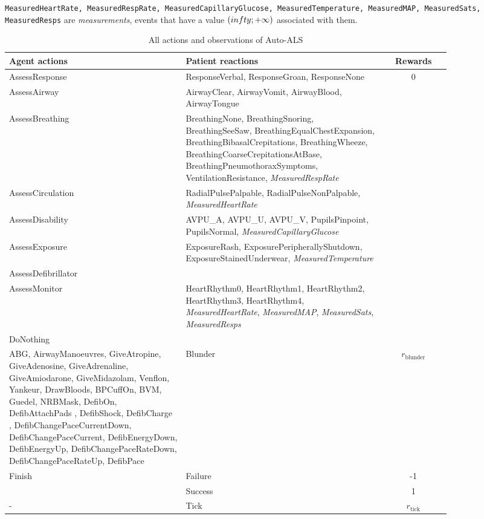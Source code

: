\texttt{MeasuredHeartRate, MeasuredRespRate, MeasuredCapillaryGlucose, MeasuredTemperature, MeasuredMAP, MeasuredSats, MeasuredResps} are \emph{measurements}, events that have a value $(\-infty; +\infty)$ associated with them.

\begin{table*}[]
\begin{tabular}{|p{0.4\linewidth}|p{0.45\linewidth}|c|}
\toprule
Agent actions &
  Patient reactions & Rewards
   \\
   \midrule
AssessResponse &
  ResponseVerbal,     ResponseGroan,     ResponseNone &
  \multirow{9}{*}{0} \\
AssessAirway &
  AirwayClear,     AirwayVomit,     AirwayBlood,     AirwayTongue &
   \\
AssessBreathing &
  BreathingNone,     BreathingSnoring,     BreathingSeeSaw,     BreathingEqualChestExpansion,     BreathingBibasalCrepitations,     BreathingWheeze,     BreathingCoarseCrepitationsAtBase,     BreathingPneumothoraxSymptoms,  VentilationResistance, \emph{MeasuredRespRate} &
   \\
AssessCirculation &
  RadialPulsePalpable,     RadialPulseNonPalpable, \emph{MeasuredHeartRate} &
   \\
AssessDisability &
  AVPU\_A,     AVPU\_U,     AVPU\_V, PupilsPinpoint,     PupilsNormal, \emph{MeasuredCapillaryGlucose} &
   \\
AssessExposure &
  ExposureRash,     ExposurePeripherallyShutdown,     ExposureStainedUnderwear, \emph{MeasuredTemperature} &
   \\
AssessDefibrillator &
   &
   \\
AssessMonitor &
  HeartRhythm0,     HeartRhythm1,     HeartRhythm2,     HeartRhythm3,     HeartRhythm4, \emph{MeasuredHeartRate}, \emph{MeasuredMAP}, \emph{MeasuredSats}, \emph{MeasuredResps} &
   \\
   DoNothing & & \\
   \midrule
ABG,     AirwayManoeuvres,     GiveAtropine,     GiveAdenosine,     GiveAdrenaline,     GiveAmiodarone,     GiveMidazolam,     Venflon,     Yankeur,     DrawBloods,     BPCuffOn,     BVM,     Guedel,     NRBMask,     DefibOn,     DefibAttachPads ,     DefibShock,     DefibCharge ,     DefibChangePaceCurrentDown,     DefibChangePaceCurrent,     DefibEnergyDown,     DefibEnergyUp,     DefibChangePaceRateDown,     DefibChangePaceRateUp,     DefibPace& 
   Blunder & $r_\text{blunder}$
   \\
   \midrule
   \multirow{2}{*}{Finish} & Failure & -1 \\
   & Success & 1 \\
   \midrule
   - & Tick & $r_\text{tick}$ \\
  \bottomrule
\end{tabular}
\caption{All actions and observations of Auto-ALS}
\label{tab:auto-als}
\end{table*}

